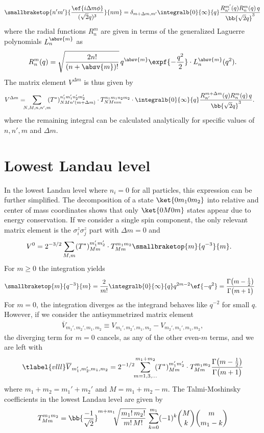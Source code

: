 \begin{align}
\smallbraketop{n'm'}{\frac{\ef{i\Delta m \phi}}{(\sqrt{2} q)^3}}{nm} = \delta_{m+\Delta m,m'} \integralb{0}{\infty}{q} \frac{R_{n'}^{m'}(q) R_n^m(q) \,q}{\bb{\sqrt{2} q}^3}
\end{align}
where the radial functions $R_n^m$ are given in terms of the generalized Laguerre polynomials $L_n^{\absv{m}}$ as
\begin{align}
R_n^m(q) = \sqrt{\frac{2n!}{(n+\absv{m})!}}\, q^{\absv{m}}\expf{-\frac{q^2}{2}}\cdot L_n^{\absv{m}}(q^2).
\end{align}
The matrix element $V^{\Delta m}$ is thus given by
\begin{align}
V^{\Delta m}= \!\!\! &\sum_{N,M,n,n',m} \!\!\! (T^*)^{n_1'm_1'n_2'm_2'}_{NMn'(m+\Delta m)} \cdot T^{n_1m_1n_2m_2}_{NMnm} \cdot
 \integralb{0}{\infty}{q} \frac{R_{n'}^{m+\Delta m}(q) R_n^m(q) \,q}{\bb{\sqrt{2} q}^3}.
\end{align}
where the remaining integral can be calculated analytically for specific values of $n,n',m$ and $\Delta m$.

\section{Lowest Landau level}
In the lowest Landau level where $n_i=0$ for all particles, this expression can be further simplified. The decomposition of a state $\ket{0m_10m_2}$ into relative and center of mass coordinates shows that only $\ket{0M0m}$ states appear due to energy conservation. If we consider a single spin component, the only relevant matrix element is the $\sigma^z_i \sigma^z_j$ part with $\Delta m=0$ and
\begin{align}
V^0 &= 2^{-3/2} \sum_{M,m}  (T^*)^{m_1'm_2'}_{Mm} \cdot T^{m_1m_2}_{Mm} \smallbraketop{m}{q^{-3}}{m}.
\end{align}
For $m\ge 0$ the integration yields
\begin{align}
\smallbraketop{m}{q^{-3}}{m} &= \frac{2}{m!} \integralb{0}{\infty}{q} q^{2m-2} \ef{-q^2}
= \frac{\Gamma\big(m-\frac{1}{2}\big)}{\Gamma\big(m+1\big)}
\end{align}
For $m=0$, the integration diverges as the integrand behaves like $q^{-2}$ for small $q$. However, if we consider the antisymmetrized matrix element
\begin{align}
\overline{V}_{m_1',m_2',m_1,m_2} \equiv V_{m_1',m_2',m_1,m_2} - V_{m_2',m_1',m_1,m_2},
\end{align}
the diverging term for $m=0$ cancels, as any of the other even-$m$ terms, and we are left with
\begin{align} \tlabel{vlll}
\overline{V}_{m_1',m_2',m_1,m_2} = 2^{-1/2} \!\! \sum_{m = 1,3,\dots}^{m_1+m_2} \!\! (T^*)^{m_1'm_2'}_{Mm} \cdot T^{m_1m_2}_{Mm} \frac{\Gamma\big(m-\frac{1}{2}\big)}{\Gamma\big(m+1\big)}
\end{align}
where $m_1+m_2 = m_1'+m_2'$ and  $M=m_1+m_2-m$. The Talmi-Moshinsky coefficients in the lowest Landau level are given by
\begin{align}
T^{m_1m_2}_{Mm} = \bb{\frac{-1}{\sqrt{2}}}^{m+m_1} \!\! \sqrt{\frac{m_1!\,m_2!}{m!\, M!}} \,\sum_{k=0}^{m_1} (-1)^k \binom{M}{k} \binom{m}{m_1-k}
\end{align}
